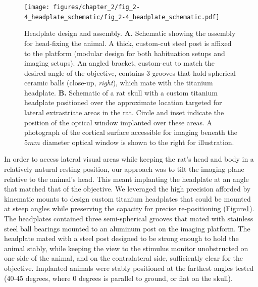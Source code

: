 \begin{figure}
    \texttt{[image: figures/chapter\_2/fig\_2-4\_headplate\_schematic/fig\_2-4\_headplate\_schematic.pdf]}
    \vspace{.1in}
    \caption[Headplate design and assembly]{Headplate design and assembly. \textbf{A.} Schematic showing the assembly for head-fixing the animal. A thick, custom-cut steel post is affixed to the platform (modular design for both habituation setups and imaging setups). An angled bracket, custom-cut to match the desired angle of the objective, contains 3 grooves that hold spherical ceramic balls (close-up, \textit{right}), which mate with the titanium headplate. \textbf{B.} Schematic of a rat skull with a custom titanium headplate positioned over the approximate location targeted for lateral extrastriate areas in the rat. Circle and inset indicate the position of the optical window implanted over these areas. A photograph of the cortical surface accessible for imaging beneath the 5$mm$ diameter optical window is shown to the right for illustration. 
    \label{fig:headplate_schematic}}
\end{figure}

In order to access lateral visual areas while keeping the rat’s head and body in a relatively natural resting position, our approach was to tilt the imaging plane relative to the animal’s head. This meant implanting the headplate at an angle that matched that of the objective. We leveraged the high precision afforded by kinematic mounts to design custom titanium headplates that could be mounted at steep angles while preserving the capacity for precise re-positioning (Figure\ref{fig:headplate_schematic}). The headplates contained three semi-spherical grooves that mated with stainless steel ball bearings mounted to an aluminum post on the imaging platform. The headplate mated with a steel post designed to be strong enough to hold the animal stably, while keeping the view to the stimulus monitor unobstructed on one side of the animal, and on the contralateral side, sufficiently clear for the objective. Implanted animals were stably positioned at the farthest angles tested (40-45 degrees, where 0 degrees is parallel to ground, or flat on the skull).  

